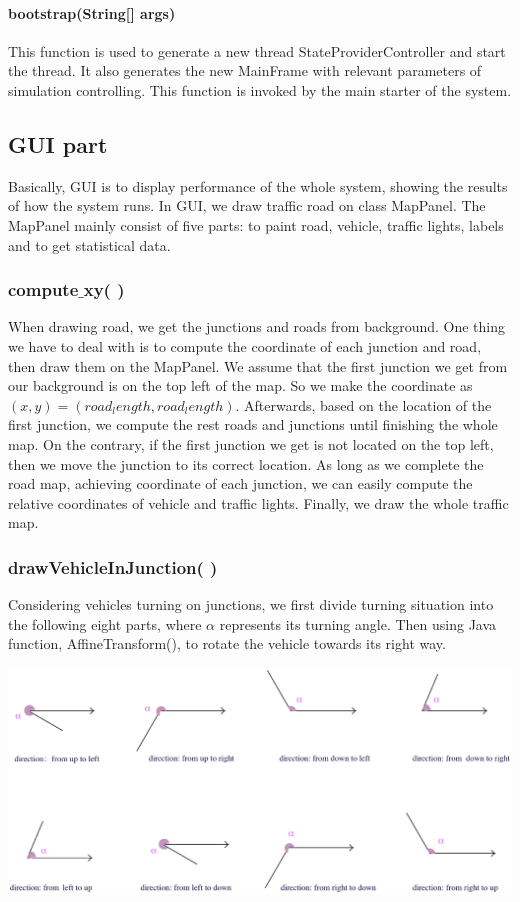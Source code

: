 \documentclass[a4paper,12pt]{article}
\begin{document}
\paragraph{bootstrap(String[] args)} This function is used to generate a new thread StateProviderController and start the thread. It also generates the new MainFrame with relevant parameters of simulation controlling. This function is invoked by the main starter of the system.

\subsection{GUI part}

Basically, GUI is to display performance of the whole system, showing the results of how the system runs. In GUI, we draw traffic road on class MapPanel. The MapPanel mainly consist of five parts: to paint road, vehicle, traffic lights, labels and to get statistical data.

\subsubsection{compute$\_$xy( )}
When drawing road, we get the junctions and roads from background. One thing we have to deal with is to compute the coordinate of each junction and road, then draw them on the MapPanel. We assume that the first junction we get from our background is on the top left of the map. So we make the coordinate as $(x,y)=(road_length, road_length)$. Afterwards, based on the location of the first junction, we compute the rest roads and junctions until finishing the whole map. On the contrary, if the first junction we get is not located on the top left, then we move the junction to its correct location. As long as we complete the road map, achieving coordinate of each junction, we can easily compute the relative coordinates of vehicle and traffic lights. Finally, we draw the whole traffic map.

\subsubsection{drawVehicleInJunction( )}
Considering vehicles turning on junctions, we first divide turning situation into the following eight parts, where $\alpha$ represents its turning angle. Then using Java function, AffineTransform(), to rotate the vehicle towards its right way.
\begin{center}
	\includegraphics[width=14cm]{GUI_p1.eps}
\end{center}
\end{document}
